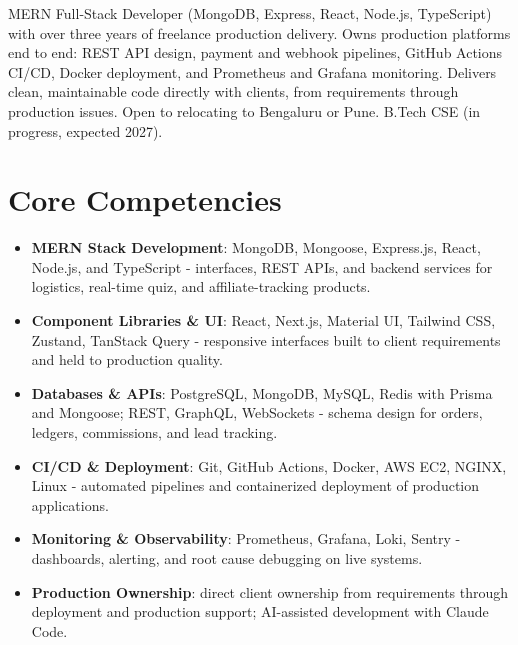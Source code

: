 \documentclass[11pt,a4paper,sans]{moderncv}
\begin{document}
\makecvtitle


\vspace{6pt}
\small{MERN Full-Stack Developer (MongoDB, Express, React, Node.js, TypeScript) with over three years of freelance production delivery. Owns production platforms end to end: REST API design, payment and webhook pipelines, GitHub Actions CI/CD, Docker deployment, and Prometheus and Grafana monitoring. Delivers clean, maintainable code directly with clients, from requirements through production issues. Open to relocating to Bengaluru or Pune. B.Tech CSE (in progress, expected 2027).}


\section{Core Competencies}
\vspace{1pt}
\begin{itemize}

\item \textbf{MERN Stack Development}: MongoDB, Mongoose, Express.js, React, Node.js, and TypeScript - interfaces, REST APIs, and backend services for logistics, real-time quiz, and affiliate-tracking products.

\item \textbf{Component Libraries \& UI}: React, Next.js, Material UI, Tailwind CSS, Zustand, TanStack Query - responsive interfaces built to client requirements and held to production quality.

\item \textbf{Databases \& APIs}: PostgreSQL, MongoDB, MySQL, Redis with Prisma and Mongoose; REST, GraphQL, WebSockets - schema design for orders, ledgers, commissions, and lead tracking.

\item \textbf{CI/CD \& Deployment}: Git, GitHub Actions, Docker, AWS EC2, NGINX, Linux - automated pipelines and containerized deployment of production applications.

\item \textbf{Monitoring \& Observability}: Prometheus, Grafana, Loki, Sentry - dashboards, alerting, and root cause debugging on live systems.

\item \textbf{Production Ownership}: direct client ownership from requirements through deployment and production support; AI-assisted development with Claude Code.

\end{itemize}
\end{document}
